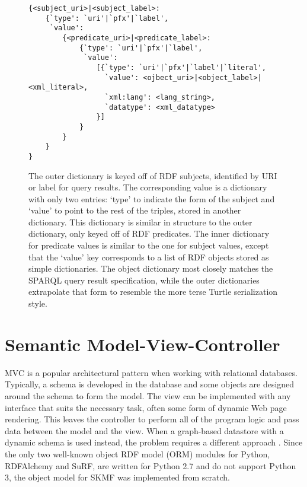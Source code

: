 \begin{figure}[p]
\singlespace
\begin{verbatim}
{<subject_uri>|<subject_label>:
    {`type': `uri'|`pfx'|`label',
     `value':
        {<predicate_uri>|<predicate_label>:
            {`type': `uri'|`pfx'|`label',
             `value':
                [{`type': `uri'|`pfx'|`label'|`literal',
                  `value': <ojbect_uri>|<object_label>|<xml_literal>,
                  `xml:lang': <lang_string>,
                  `datatype': <xml_datatype>
                }]
            }
        }
    }
}
\end{verbatim}
\caption[Structure of a triple in SKMF]
 {\narrower The outer dictionary is keyed off of RDF subjects, identified by URI or label for query results. The corresponding value is a dictionary with only two entries: `type' to indicate the form of the subject and `value' to point to the rest of the triples, stored in another dictionary. This dictionary is similar in structure to the outer dictionary, only keyed off of RDF predicates. The inner dictionary for predicate values is similar to the one for subject values, except that the `value' key corresponds to a list of RDF objects stored as simple dictionaries. The object dictionary most closely matches the SPARQL query result specification, while the outer dictionaries extrapolate that form to resemble the more terse Turtle serialization style.
 }
\label{skmf-triple}
\end{figure}



\section{Semantic Model-View-Controller}
\label{method:mvc}

MVC is a popular architectural pattern when working with relational databases. Typically, a schema is developed in the database and some objects are designed around the schema to form the model. The view can be implemented with any interface that suits the necessary task, often some form of dynamic Web page rendering. This leaves the controller to perform all of the program logic and pass data between the model and the view. When a graph-based datastore with a dynamic schema is used instead, the problem requires a different approach
\cite{semanticwebprogram}.
Since the only two well-known object RDF model (ORM) modules for Python, RDFAlchemy and SuRF, are written for Python 2.7 and do not support Python 3, the object model for SKMF was implemented from scratch.


